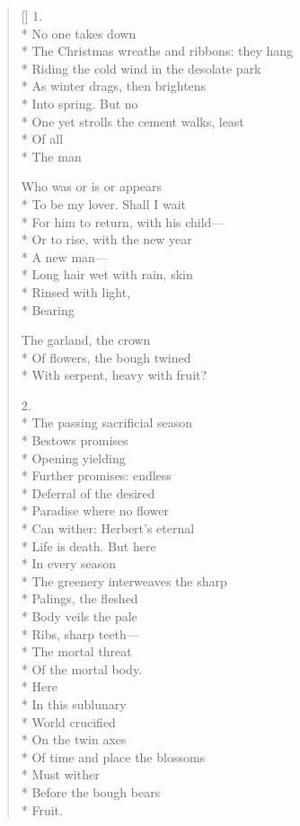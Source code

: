 \label{ch:in_time}
\settowidth{\versewidth}{The Christmas wreathes and ribbons: they flutter}
\begin{verse}[\versewidth]
1.\\*
No one takes down \\*
The Christmas wreaths and ribbons: they hang\\*
Riding the cold wind in the desolate park\\*
As winter drags, then brightens\\*
Into spring.   But no\\*
One yet strolls the cement walks, least\\*
Of all\\*
The man

Who was or is or appears\\*
To be my lover. Shall I wait\\*
For him to return, with his child---\\*
Or to rise, with the new year\\*
 A new man---\\*
Long hair wet with rain, skin\\*
Rinsed with light,\\*
Bearing

The garland, the crown\\*
Of flowers, the bough twined\\*
With serpent, heavy with fruit?

2.\\*
The passing sacrificial season\\*
Bestows promises\\*
Opening yielding\\*
Further promises: endless\\*
Deferral of the desired\\*
Paradise where no flower\\*
Can wither: Herbert's eternal\\*
Life is death.  But here\\*
In every season\\*
The greenery interweaves the sharp \\*
Palings, the fleshed\\*
Body veils the pale\\*
Ribs, sharp teeth---\\*
The mortal threat \\*
Of the mortal body.\\*
                                 Here\\*
In this sublunary \\*
World crucified\\*
On the twin axes \\*
Of time and place the blossoms\\*
Must wither\\*
Before the bough bears\\*
Fruit.


\end{verse}
